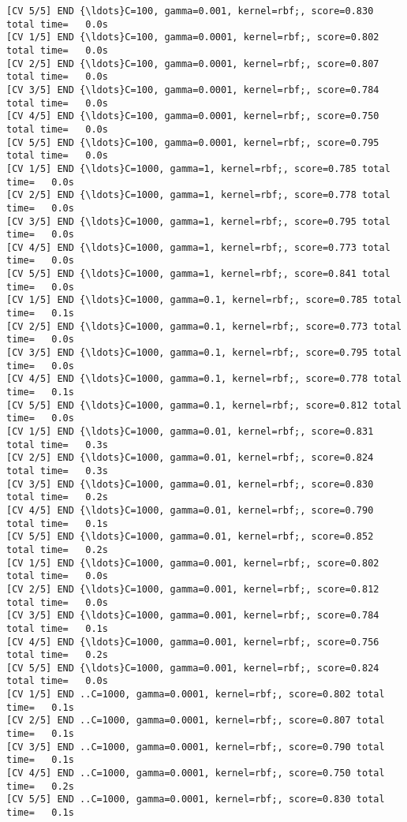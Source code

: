 \documentclass[11pt]{article}
\begin{document}
\begin{Verbatim}[commandchars=\\\{\}]
[CV 5/5] END {\ldots}C=100, gamma=0.001, kernel=rbf;, score=0.830 total time=   0.0s
[CV 1/5] END {\ldots}C=100, gamma=0.0001, kernel=rbf;, score=0.802 total time=   0.0s
[CV 2/5] END {\ldots}C=100, gamma=0.0001, kernel=rbf;, score=0.807 total time=   0.0s
[CV 3/5] END {\ldots}C=100, gamma=0.0001, kernel=rbf;, score=0.784 total time=   0.0s
[CV 4/5] END {\ldots}C=100, gamma=0.0001, kernel=rbf;, score=0.750 total time=   0.0s
[CV 5/5] END {\ldots}C=100, gamma=0.0001, kernel=rbf;, score=0.795 total time=   0.0s
[CV 1/5] END {\ldots}C=1000, gamma=1, kernel=rbf;, score=0.785 total time=   0.0s
[CV 2/5] END {\ldots}C=1000, gamma=1, kernel=rbf;, score=0.778 total time=   0.0s
[CV 3/5] END {\ldots}C=1000, gamma=1, kernel=rbf;, score=0.795 total time=   0.0s
[CV 4/5] END {\ldots}C=1000, gamma=1, kernel=rbf;, score=0.773 total time=   0.0s
[CV 5/5] END {\ldots}C=1000, gamma=1, kernel=rbf;, score=0.841 total time=   0.0s
[CV 1/5] END {\ldots}C=1000, gamma=0.1, kernel=rbf;, score=0.785 total time=   0.1s
[CV 2/5] END {\ldots}C=1000, gamma=0.1, kernel=rbf;, score=0.773 total time=   0.0s
[CV 3/5] END {\ldots}C=1000, gamma=0.1, kernel=rbf;, score=0.795 total time=   0.0s
[CV 4/5] END {\ldots}C=1000, gamma=0.1, kernel=rbf;, score=0.778 total time=   0.1s
[CV 5/5] END {\ldots}C=1000, gamma=0.1, kernel=rbf;, score=0.812 total time=   0.0s
[CV 1/5] END {\ldots}C=1000, gamma=0.01, kernel=rbf;, score=0.831 total time=   0.3s
[CV 2/5] END {\ldots}C=1000, gamma=0.01, kernel=rbf;, score=0.824 total time=   0.3s
[CV 3/5] END {\ldots}C=1000, gamma=0.01, kernel=rbf;, score=0.830 total time=   0.2s
[CV 4/5] END {\ldots}C=1000, gamma=0.01, kernel=rbf;, score=0.790 total time=   0.1s
[CV 5/5] END {\ldots}C=1000, gamma=0.01, kernel=rbf;, score=0.852 total time=   0.2s
[CV 1/5] END {\ldots}C=1000, gamma=0.001, kernel=rbf;, score=0.802 total time=   0.0s
[CV 2/5] END {\ldots}C=1000, gamma=0.001, kernel=rbf;, score=0.812 total time=   0.0s
[CV 3/5] END {\ldots}C=1000, gamma=0.001, kernel=rbf;, score=0.784 total time=   0.1s
[CV 4/5] END {\ldots}C=1000, gamma=0.001, kernel=rbf;, score=0.756 total time=   0.2s
[CV 5/5] END {\ldots}C=1000, gamma=0.001, kernel=rbf;, score=0.824 total time=   0.0s
[CV 1/5] END ..C=1000, gamma=0.0001, kernel=rbf;, score=0.802 total time=   0.1s
[CV 2/5] END ..C=1000, gamma=0.0001, kernel=rbf;, score=0.807 total time=   0.1s
[CV 3/5] END ..C=1000, gamma=0.0001, kernel=rbf;, score=0.790 total time=   0.1s
[CV 4/5] END ..C=1000, gamma=0.0001, kernel=rbf;, score=0.750 total time=   0.2s
[CV 5/5] END ..C=1000, gamma=0.0001, kernel=rbf;, score=0.830 total time=   0.1s
    \end{Verbatim}
\end{document}
